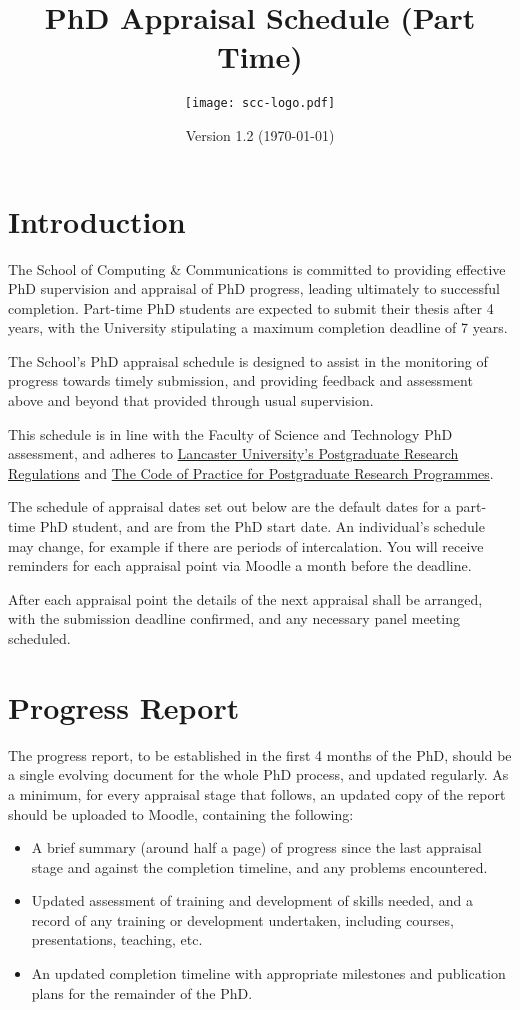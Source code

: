 \documentclass[12pt,a4paper]{article}
\title{PhD Appraisal Schedule (Part Time)}
\author{\texttt{[image: scc-logo.pdf]}}
\date{Version 1.2 (\today)}
\begin{document}
\maketitle

\section{Introduction}
The School of Computing \& Communications is committed to providing effective PhD supervision and appraisal of PhD progress, leading ultimately to successful completion. Part-time PhD students are expected to submit their thesis after 4 years, with the University stipulating a maximum completion deadline of 7 years.

The School's PhD appraisal schedule is designed to assist in the monitoring of progress towards timely submission, and providing feedback and assessment above and beyond that provided through usual supervision.

This schedule is in line with the Faculty of Science and Technology PhD assessment, and adheres to
\href{https://gap.lancs.ac.uk/ASQ/QAE/MARP/Documents/PGR-Regs.pdf}{Lancaster University's Postgraduate Research Regulations} and 
\href{https://gap.lancs.ac.uk/ASQ/Policies/Documents/Postgraduate-Research-Code-of-Practice.pdf}{The Code of Practice for Postgraduate Research Programmes}.

The schedule of appraisal dates set out below are the default dates for a part-time PhD student, and are from the PhD start date. An individual's schedule may change, for example if there are periods of intercalation. You will receive reminders for each appraisal point via Moodle a month before the deadline.

After each appraisal point the details of the next appraisal shall be arranged, with the submission deadline confirmed, and any necessary panel meeting scheduled.

\section{Progress Report}
The progress report, to be established in the first 4 months of the PhD, should be a single evolving document for the whole PhD process, and updated regularly. As a minimum, for every appraisal stage that follows, an updated copy of the report should be uploaded to Moodle, containing the following:
\begin{itemize}
	\item A brief summary (around half a page) of progress since the last appraisal stage and against the completion timeline, and any problems encountered.
	\item Updated assessment of training and development of skills needed, and a record of any training or development undertaken, including courses, presentations, teaching, etc.\
	\item An updated completion timeline with appropriate milestones and publication plans for the remainder of the PhD.
\end{itemize}
\end{document}
